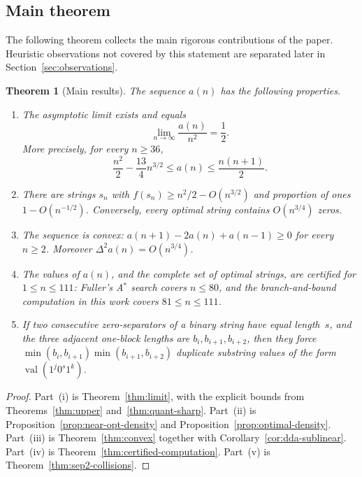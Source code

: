 \documentclass[11pt,a4paper]{article}
\theoremstyle{plain}
\newtheorem{theorem}{Theorem}[section]
\theoremstyle{definition}
\theoremstyle{remark}
\newcommand{\val}{\operatorname{val}}
\newcommand{\DDa}{\Delta^2 a}
\begin{document}
\subsection*{Main theorem}

The following theorem collects the main rigorous contributions of the
paper.  Heuristic observations not covered by this statement are
separated later in Section~\ref{sec:observations}.

\begin{theorem}[Main results]\label{thm:main-results}
  The sequence $a(n)$ has the following properties.
  \begin{enumerate}[label=(\roman*),nosep]
    \item The asymptotic limit exists and equals
      \[
        \lim_{n\to\infty} \frac{a(n)}{n^2} = \frac12.
      \]
      More precisely, for every $n \ge 36$,
      \[
        \frac{n^2}{2} - \frac{13}{4}n^{3/2}
        \le a(n) \le \frac{n(n+1)}{2}.
      \]
    \item There are strings $s_n$ with
      $f(s_n) \ge n^2/2 - O(n^{3/2})$ and
      proportion of ones $1 - O(n^{-1/2})$.  Conversely, every
      optimal string contains $O(n^{3/4})$ zeros.
    \item The sequence is convex:
      $a(n+1)-2a(n)+a(n-1) \ge 0$ for every $n \ge 2$.
      Moreover $\DDa(n)=O(n^{3/4})$.
    \item The values of $a(n)$, and the complete set of optimal
      strings, are certified for $1 \le n \le 111$: Fuller's A$^*$ search
      covers $n \le 80$, and the branch-and-bound computation in this
      work covers $81 \le n \le 111$.
    \item If two consecutive zero-separators of a binary string have
      equal length~$s$, and the three adjacent one-block lengths are
      $b_i,b_{i+1},b_{i+2}$, then they force
      $\min(b_i,b_{i+1})\min(b_{i+1},b_{i+2})$ duplicate substring
      values of the form $\val(1^j0^s1^k)$.
  \end{enumerate}
\end{theorem}

\begin{proof}
  Part~(i) is Theorem~\ref{thm:limit}, with the explicit bounds from
  Theorems~\ref{thm:upper} and~\ref{thm:quant-sharp}.  Part~(ii) is
  Proposition~\ref{prop:near-opt-density} and
  Proposition~\ref{prop:optimal-density}.  Part~(iii) is
  Theorem~\ref{thm:convex} together with
  Corollary~\ref{cor:dda-sublinear}.  Part~(iv) is
  Theorem~\ref{thm:certified-computation}.  Part~(v) is
  Theorem~\ref{thm:sep2-collisions}.
\end{proof}
\end{document}
